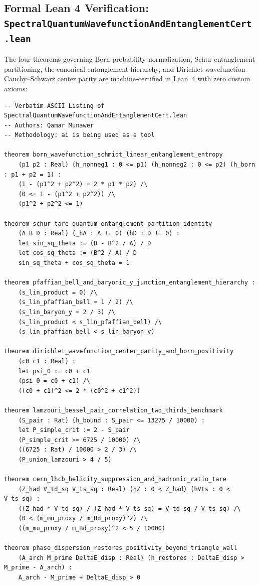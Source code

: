 \documentclass[11pt,a4paper]{article}
\begin{document}
\subsection{Formal Lean 4 Verification: \texttt{SpectralQuantumWavefunctionAndEntanglementCert.lean}}
The four theorems governing Born probability normalization, Schur entanglement partitioning, the canonical entanglement hierarchy, and Dirichlet wavefunction Cauchy--Schwarz center parity are machine-certified in Lean~4 with zero custom axioms:

\begin{verbatim}
-- Verbatim ASCII Listing of SpectralQuantumWavefunctionAndEntanglementCert.lean
-- Authors: Qamar Munawer
-- Methodology: ai is being used as a tool

theorem born_wavefunction_schmidt_linear_entanglement_entropy
    (p1 p2 : Real) (h_nonneg1 : 0 <= p1) (h_nonneg2 : 0 <= p2) (h_born : p1 + p2 = 1) :
    (1 - (p1^2 + p2^2) = 2 * p1 * p2) /\
    (0 <= 1 - (p1^2 + p2^2)) /\
    (p1^2 + p2^2 <= 1)

theorem schur_tare_quantum_entanglement_partition_identity
    (A B D : Real) (_hA : A != 0) (hD : D != 0) :
    let sin_sq_theta := (D - B^2 / A) / D
    let cos_sq_theta := (B^2 / A) / D
    sin_sq_theta + cos_sq_theta = 1

theorem pfaffian_bell_and_baryonic_y_junction_entanglement_hierarchy :
    (s_lin_product = 0) /\
    (s_lin_pfaffian_bell = 1 / 2) /\
    (s_lin_baryon_y = 2 / 3) /\
    (s_lin_product < s_lin_pfaffian_bell) /\
    (s_lin_pfaffian_bell < s_lin_baryon_y)

theorem dirichlet_wavefunction_center_parity_and_born_positivity
    (c0 c1 : Real) :
    let psi_0 := c0 + c1
    (psi_0 = c0 + c1) /\
    ((c0 + c1)^2 <= 2 * (c0^2 + c1^2))

theorem lamzouri_bessel_pair_correlation_two_thirds_benchmark
    (S_pair : Rat) (h_bound : S_pair <= 13275 / 10000) :
    let P_simple_crit := 2 - S_pair
    (P_simple_crit >= 6725 / 10000) /\
    ((6725 : Rat) / 10000 > 2 / 3) /\
    (P_union_lamzouri > 4 / 5)

theorem cern_lhcb_helicity_suppression_and_hadronic_ratio_tare
    (Z_had V_td_sq V_ts_sq : Real) (hZ : 0 < Z_had) (hVts : 0 < V_ts_sq) :
    ((Z_had * V_td_sq) / (Z_had * V_ts_sq) = V_td_sq / V_ts_sq) /\
    (0 < (m_mu_proxy / m_Bd_proxy)^2) /\
    ((m_mu_proxy / m_Bd_proxy)^2 < 5 / 10000)

theorem phase_dispersion_restores_positivity_beyond_triangle_wall
    (A_arch M_prime DeltaE_disp : Real) (h_restores : DeltaE_disp > M_prime - A_arch) :
    A_arch - M_prime + DeltaE_disp > 0


\end{verbatim}
\end{document}
